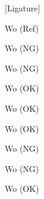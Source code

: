 \documentclass{article}
\begin{document}
[Ligature]\par
{}Wo                 (Ref)\par
{}W\relax          o (NG)\par
{}W\unskip         o (NG)\par
{}W\inhibitglue    o (OK)\par
{}W\removejfmglue  o (OK)\par
{}W\removejfmglueA o (OK)\par
{}W\removejfmglueB o (NG)\par
{}W\removejfmglueC o (NG)\par
{}W\removejfmglueD o (OK)\par
\end{document}

